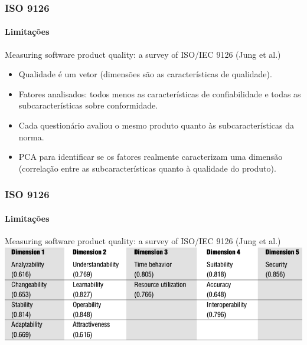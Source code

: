 \begin{frame}
	\frametitle{ISO 9126}
	\framesubtitle{Limitações}
	
	\begin{block:fact}{Measuring software product quality: a survey of ISO/IEC 9126 (Jung et al.)}
		\begin{itemize}
			\item Qualidade é um vetor (dimensões são as características de qualidade).

			\item Fatores analisados: todos menos as características de confiabilidade
			e todas as subcaracterísticas sobre conformidade.
			
			\item Cada questionário avaliou o mesmo produto quanto às subcaracterísticas
			da norma.
			
			\item PCA para identificar se os fatores realmente caracterizam uma
			dimensão (correlação entre as subcaracterísticas quanto à qualidade do
			produto).
		\end{itemize}
	\end{block:fact}
\end{frame}


\begin{frame}
	\frametitle{ISO 9126}
	\framesubtitle{Limitações}
	
	\begin{block:fact}{Measuring software product quality: a survey of ISO/IEC 9126 (Jung et al.)}
		\centering
		\includegraphics[width=\textwidth]{software-engineering/project-management/product/iso9126/jung-etal}
	\end{block:fact}
	
\end{frame}


